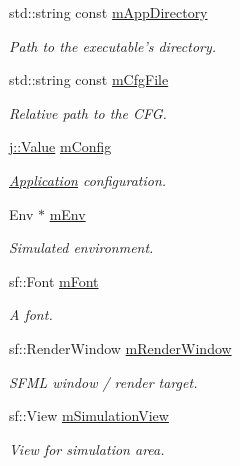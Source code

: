 \begin{DoxyCompactItemize}
\item 
std\-::string const \hyperlink{class_application_a4dfc28cc57cbf7099a9fb307f1bddb66}{m\-App\-Directory}
\begin{DoxyCompactList}\small\item\em Path to the executable's directory. \end{DoxyCompactList}\item 
std\-::string const \hyperlink{class_application_a47b102eeb6056257fad1b1073c62cd0e}{m\-Cfg\-File}
\begin{DoxyCompactList}\small\item\em Relative path to the C\-F\-G. \end{DoxyCompactList}\item 
\hyperlink{classj_1_1_value}{j\-::\-Value} \hyperlink{class_application_a7d54750ac09a1bc7e4d72944bb52e393}{m\-Config}
\begin{DoxyCompactList}\small\item\em \hyperlink{class_application}{Application} configuration. \end{DoxyCompactList}\item 
Env $\ast$ \hyperlink{class_application_a17edefa78adf28e93132ce3d9af8aad5}{m\-Env}
\begin{DoxyCompactList}\small\item\em Simulated environment. \end{DoxyCompactList}\item 
sf\-::\-Font \hyperlink{class_application_a697d840b0ef9b447a9463996d5963e10}{m\-Font}
\begin{DoxyCompactList}\small\item\em A font. \end{DoxyCompactList}\item 
sf\-::\-Render\-Window \hyperlink{class_application_acde37e91150ea3a16e9e4849e08c7784}{m\-Render\-Window}
\begin{DoxyCompactList}\small\item\em S\-F\-M\-L window / render target. \end{DoxyCompactList}\item 
sf\-::\-View \hyperlink{class_application_a74a68526ce8ee51762f6d3313355b918}{m\-Simulation\-View}
\begin{DoxyCompactList}\small\item\em View for simulation area. \end{DoxyCompactList}\item 

\end{DoxyCompactItemize}
